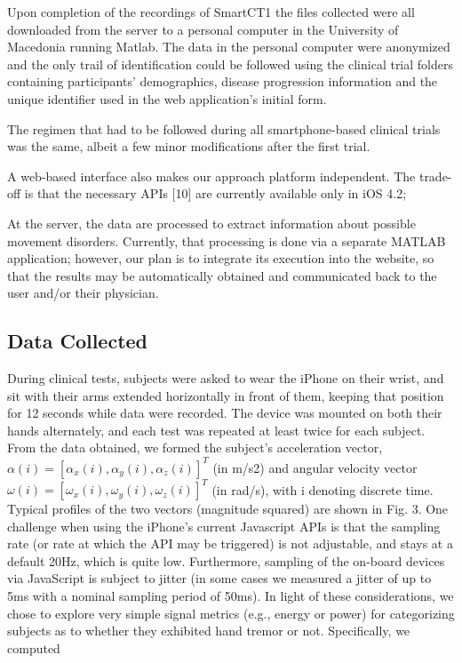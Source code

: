 Upon completion of the recordings of \gls{SmartCT1} the files collected were all downloaded from the server to a personal computer in the University of Macedonia running Matlab. The data in the personal computer were anonymized and the only trail of identification could be followed using the clinical trial folders containing participants' demographics, disease progression information and the unique identifier used in the web application's initial form. 

The regimen that had to be followed during all smartphone-based clinical trials was the same, albeit a few minor modifications after the first trial. 

A web-based interface also makes our approach platform independent. The trade-off is that the necessary APIs [10] are currently available only in iOS 4.2; 

At the server, the data are processed to extract information about possible movement disorders. Currently, that processing is done via a separate MATLAB application; however, our plan is to integrate its execution into the website, so that the results may be automatically obtained and communicated back to the user and/or their physician.  

\subsection{Data Collected}
\label{subsec:SmartCT1Data}
During clinical tests, subjects were asked to wear the iPhone on their wrist, and sit with their arms extended horizontally in front of them, keeping that position for 12 seconds while data were recorded. The device was mounted on both their hands alternately, and each test was repeated at least twice for each subject. From the data obtained, we formed the subject’s acceleration vector, $\alpha(i) = [\alpha_{x}(i),\alpha_{y}(i),\alpha_{z}(i)]^{T}$ (in m/s2) and angular velocity vector $\omega(i) = [\omega_{x}(i),\omega_{y}(i),\omega_{z}(i)]^{T}$ (in rad/s), with i denoting discrete time. Typical profiles of the two vectors (magnitude squared) are shown in Fig. 3.
One challenge when using the iPhone’s current Javascript APIs is that the sampling rate (or rate at which the API may be triggered) is not adjustable, and stays at a default 20Hz, which is quite low. Furthermore, sampling of the on-board devices via JavaScript is subject to jitter (in some cases we measured a jitter of up to 5ms with a nominal sampling period of 50ms). In light of these considerations, we chose to explore very simple signal metrics (e.g., energy or power) for categorizing subjects as to whether they exhibited hand tremor or not. Specifically, we computed

